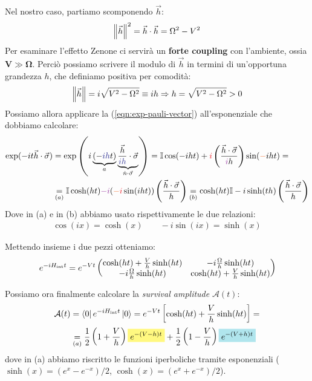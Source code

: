 \documentclass[../../InformazioneQuantistica.tex]{subfiles}
\begin{document}
Nel nostro caso, partiamo scomponendo $\vec{h}$:
\begin{align*}
\left\lVert\vec{h}\right\rVert^2={\vec{h}\cdot\vec{h}}=\Omega^2-V^2
\end{align*}
Per esaminare l'effetto Zenone ci servirà un \textbf{forte coupling} con l'ambiente, ossia $\bm{V\gg \Omega}$. Perciò possiamo scrivere il modulo di $\vec{h}$ in termini di un'opportuna grandezza $h$, che definiamo positiva per comodità:
\begin{align}
\left\lVert\vec{h}\right\rVert=i\sqrt{V^2-\Omega^2}\equiv ih \Rightarrow h=\sqrt{V^2-\Omega^2}>0
\label{eqn:h-def}
\end{align}
Possiamo allora applicare la (\ref{eqn:exp-pauli-vector}) all'esponenziale che dobbiamo calcolare:
\begin{align*}
\exp(-it\vec{h}\cdot \vec{\sigma})&=\exp\left(i\underbrace{(-\textcolor{Blue}{ih}t)}_{a} \underbrace{\frac{\vec{h}}{\textcolor{Blue}{ih}}\cdot \vec{\sigma}}_{\hat{n}\cdot\vec{\sigma}}\right) =
\bb{I}\cos(-iht) + \textcolor{Red}{i} \left(\frac{\vec{h}\cdot\vec{\sigma}}{\textcolor{Purple}{i}h}\right)\sin(\textcolor{Orange}{-}iht) =\\
&\underset{(a)}{=}\bb{I}\cosh(ht) \textcolor{Purple}{-i}(\textcolor{Orange}{-}\textcolor{Red}{i}\sin(iht))\left(\frac{\vec{h}\cdot\vec{\sigma}}{h}\right) \underset{(b)}{=} \cosh(ht)\bb{I} - i\sinh(th) \left(\frac{\vec{h}\cdot\vec{\sigma}}{h}\right)
\end{align*}
Dove in (a) e in (b) abbiamo usato rispettivamente le due relazioni:
\begin{align*}
\cos(ix) = \cosh(x) \qquad -i\sin(ix) = \sinh(x)
\end{align*}

Mettendo insieme i due pezzi otteniamo:
\begin{align*}
e^{-iH_{\operatorname{int}}t}=e^{-Vt}\begin{pmatrix}
\cosh(ht) + \frac{V}{h}\sinh(ht) & -i\frac{\Omega}{h}\sinh(ht)\\
-i\frac{\Omega}{h}\sinh(ht) & \cosh(ht) +\frac{V}{h}\sinh(ht)
\end{pmatrix}
\end{align*}

Possiamo ora finalmente calcolare la \textit{survival amplitude} $\mathcal{A}(t)$:
\begin{align*}
\mathcal{A}(t) &= \bra{0}e^{-iH_{\op{int}}t}\ket{0} = e^{-Vt}\left[\cosh(ht) + \frac{V}{h}\sinh(ht)\right]=\\
&\underset{(a)}{=} \frac{1}{2}\left(1+\frac{V}{h}\right) \hlc{Yellow}{e^{-(V-h)t} }+\frac{1}{2}\left(1-\frac{V}{h}\right) \hlc{SkyBlue}{e^{-(V+h)t}}
\end{align*}
dove in (a) abbiamo riscritto le funzioni iperboliche tramite esponenziali ($\sinh(x)=(e^{x}-e^{-x})/2$, $\cosh(x)=(e^{x}+e^{-x})/2$).\\
\end{document}
